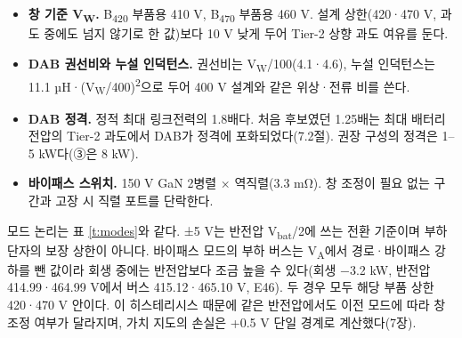 \begin{itemize}
\item \textbf{창 기준 V\textsubscript{W}.} B\textsubscript{420} 부품용 410 V, B\textsubscript{470} 부품용 460 V. 설계 상한(420·470 V, 과도 중에도 넘지 않기로 한 값)보다 10 V 낮게 두어 Tier-2 상향 과도 여유를 둔다.
\item \textbf{DAB 권선비와 누설 인덕턴스.} 권선비는 V\textsubscript{W}/100(4.1·4.6), 누설 인덕턴스는 11.1 µH·(V\textsubscript{W}/400)\textsuperscript{2}으로 두어 400 V 설계와 같은 위상·전류 비를 쓴다.
\item \textbf{DAB 정격.} 정적 최대 링크전력의 1.8배다. 처음 후보였던 1.25배는 최대 배터리 전압의 Tier-2 과도에서 DAB가 정격에 포화되었다(7.2절). 권장 구성의 정격은 1–5 kW다(③은 8 kW).
\item \textbf{바이패스 스위치.} 150 V GaN 2병렬 × 역직렬(3.3 mΩ). 창 조정이 필요 없는 구간과 고장 시 직렬 포트를 단락한다.
\end{itemize}

모드 논리는 표 \ref{t:modes}와 같다. ±5 V는 반전압 V\textsubscript{bat}/2에 쓰는 전환 기준이며 부하 단자의 보장 상한이 아니다. 바이패스 모드의 부하 버스는 V\textsubscript{A}에서 경로·바이패스 강하를 뺀 값이라 회생 중에는 반전압보다 조금 높을 수 있다(회생 −3.2 kW, 반전압 414.99·464.99 V에서 버스 415.12·465.10 V, E46). 두 경우 모두 해당 부품 상한 420·470 V 안이다. 이 히스테리시스 때문에 같은 반전압에서도 이전 모드에 따라 창 조정 여부가 달라지며, 가치 지도의 손실은 +0.5 V 단일 경계로 계산했다(7장).

